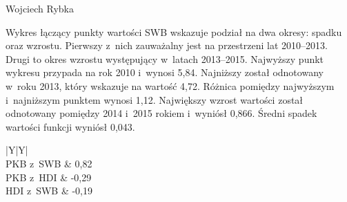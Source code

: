 \begin{artplenv}{Wojciech Rybka}
%
%

Wykres łączący punkty wartości SWB wskazuje podział na dwa okresy: spadku oraz wzrostu. Pierwszy z~nich zauważalny jest
na przestrzeni lat 2010--2013. Drugi to okres wzrostu występujący w~latach 2013--2015. Najwyższy punkt wykresu przypada
na rok 2010 i~wynosi 5,84. Najniższy został odnotowany w~roku 2013, który wskazuje na wartość 4,72. Różnica pomiędzy
najwyższym i~najniższym punktem wynosi 1,12.  Największy wzrost wartości został odnotowany pomiędzy 2014 i~2015 rokiem
i~wyniósł 0,866. Średni spadek wartości funkcji wyniósł 0,043.

\captionsetup[table]{name=Tabela}
\begin{table}[H]
	\begin{tabularx}{\textwidth}{|Y|Y|}
		\hline
		\\\hline
		PKB z~SWB &
		0,82\\\hline
		PKB z~HDI &
		-0,29\\\hline
		HDI z~SWB &
		{}-0,19\\\hline
	\end{tabularx}
	
	\caption{Wartości związku pomiędzy wskaźnikami Grecji.
		Źródło: obliczenia własne na podstawie
		\parencite{international_monetary_fund_world_2019a,united_nations_development_programme_human_2019,noauthor_world_2018}.
	}
	\label{tab5:ryb}
\end{table}


%


\end{artplenv}
